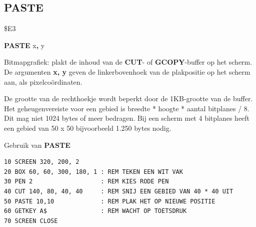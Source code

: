 \subsection{PASTE}
\begin{description}[leftmargin=2cm,style=nextline]
\item [Token:]    \$E3

\item [Formaat:]   {\bf PASTE} x{\bf,} y

\item [Gebruik:]    Bitmapgrafiek: plakt de inhoud van de {\bf CUT}- of {\bf GCOPY}-buffer op het scherm. De argumenten {\bf x, y} geven de linkerbovenhoek van de plakpositie op het scherm aan, als pixelcoördinaten.

\item [Opmerkingen:]  De grootte van de rechthoekje wordt beperkt door de 1KB-grootte van de buffer. Het geheugenvereiste voor een gebied is breedte * hoogte * aantal bitplanes / 8. Dit mag niet 1024 bytes of meer bedragen. Bij een scherm met 4 bitplanes heeft een gebied van 50 x 50 bijvoorbeeld 1.250 bytes nodig.

\item [Voorbeeld:]  Gebruik van {\bf PASTE}

\begin{tcolorbox}[colback=black,coltext=white]
\verbatimfont{\codefont}
\begin{verbatim}
10 SCREEN 320, 200, 2
20 BOX 60, 60, 300, 180, 1 : REM TEKEN EEN WIT VAK
30 PEN 2                   : REM KIES RODE PEN
40 CUT 140, 80, 40, 40     : REM SNIJ EEN GEBIED VAN 40 * 40 UIT
50 PASTE 10,10             : REM PLAK HET OP NIEUWE POSITIE
60 GETKEY A$               : REM WACHT OP TOETSDRUK
70 SCREEN CLOSE
\end{verbatim}
\end{tcolorbox}


\end{description}


\newpage
